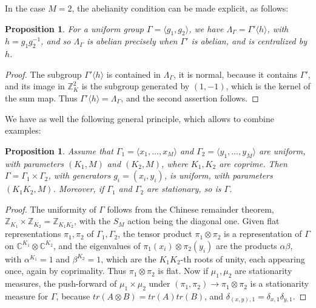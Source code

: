 \documentclass[12pt]{amsart}
\newtheorem{proposition}[theorem]{Proposition}
\theoremstyle{definition}
\begin{document}
In the case $M=2$, the abelianity condition can be made explicit, as follows:

\begin{proposition}
For a uniform group $\Gamma=\langle g_1,g_2\rangle$, we have $\Lambda_\Gamma=\Gamma'\langle h\rangle$, with $h=g_1g_2^{-1}$, and so $\Lambda_\Gamma$ is abelian precisely when $\Gamma'$ is abelian, and is centralized by $h$.
\end{proposition}

\begin{proof}
The subgroup $\Gamma'\langle h\rangle$ is contained in $\Lambda_\Gamma$, it is normal, because it contains $\Gamma'$, and its image in $\mathbb Z_K^2$ is the subgroup generated by $(1,-1)$, which is the kernel of the sum map. Thus $\Gamma'\langle h\rangle=\Lambda_\Gamma$, and the second assertion follows.
\end{proof}

We have as well the following general principle, which allows to combine examples:

\begin{proposition}
Assume that $\Gamma_1=\langle x_1,\ldots,x_M\rangle$ and $\Gamma_2=\langle y_1,\ldots,y_M\rangle$ are uniform, with parameters $(K_1,M)$ and $(K_2,M)$, where $K_1,K_2$ are coprime. Then $\Gamma=\Gamma_1\times\Gamma_2$, with generators $g_i=(x_i,y_i)$, is uniform, with parameters $(K_1K_2,M)$. Moreover, if $\Gamma_1$ and $\Gamma_2$ are stationary, so is $\Gamma$.
\end{proposition}

\begin{proof}
The uniformity of $\Gamma$ follows from the Chinese remainder theorem, $\mathbb Z_{K_1}\times\mathbb Z_{K_2}=\mathbb Z_{K_1K_2}$, with the $S_M$ action being the diagonal one. Given flat representations $\pi_1,\pi_2$ of $\Gamma_1,\Gamma_2$, the tensor product $\pi_1\otimes\pi_2$ is a representation of $\Gamma$ on $\mathbb C^{K_1}\otimes\mathbb C^{K_2}$, and the eigenvalues of $\pi_1(x_i)\otimes\pi_2(y_i)$ are the products $\alpha\beta$, with $\alpha^{K_1}=1$ and $\beta^{K_2}=1$, which are the $K_1K_2$-th roots of unity, each appearing once, again by coprimality. Thus $\pi_1\otimes\pi_2$ is flat. Now if $\mu_1,\mu_2$ are stationarity measures, the push-forward of $\mu_1\times\mu_2$ under $(\pi_1,\pi_2)\to\pi_1\otimes\pi_2$ is a stationarity measure for $\Gamma$, because $tr(A\otimes B)=tr(A)tr(B)$, and $\delta_{(x,y),1}=\delta_{x,1}\delta_{y,1}$.
\end{proof}
\end{document}
